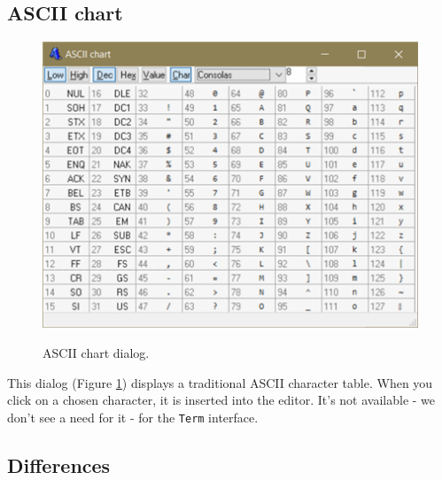 \subsection{ASCII chart}

\begin{figure}[H]
  \includegraphics[scale=0.50]{./res/dlg_ascii_chart.png} \\
  \caption{ASCII chart dialog.}
  \label{fig:dlg_ascii_chart}
\end{figure}
This dialog
(Figure \ref{fig:dlg_ascii_chart})
displays a traditional ASCII character table. When you click on a chosen character, it is inserted
into the editor. It's not available - we don't see a need for it - for the \texttt{Term} interface.


\hypertarget{dlg_differences}{}
\subsection{Differences}

